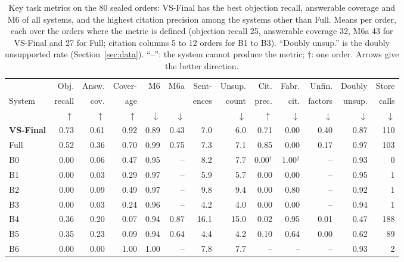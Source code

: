 \documentclass[11pt]{article}
\newcommand{\vs}{VS-Final}
\begin{document}
\begin{table}[t]
\centering\small
\setlength\tabcolsep{4.5pt}
\begin{tabular}{@{}lrrrrrrrrrrrr@{}}
\toprule
 & Obj. & Answ. & Cover- & M6 & M6a & Sent- & Unsup. & Cit. & Fabr. & Unfin. & Doubly & Store \\
System & recall & cov. & age & & & ences & count & prec. & cit. & factors & unsup. & calls \\
 & $\uparrow$ & $\uparrow$ & $\uparrow$ & $\downarrow$ & $\downarrow$ & & $\downarrow$ & $\uparrow$ & $\downarrow$ & $\downarrow$ & $\downarrow$ & $\downarrow$ \\
\midrule
\textbf{\vs{}} & 0.73 & 0.61 & 0.92 & 0.89 & 0.43 & 7.0 & 6.0 & 0.71 & 0.00 & 0.40 & 0.87 & 110 \\
Full & 0.52 & 0.36 & 0.70 & 0.99 & 0.75 & 7.3 & 7.1 & 0.85 & 0.00 & 0.17 & 0.97 & 103 \\
\midrule
B0 & 0.00 & 0.06 & 0.47 & 0.95 & -- & 8.2 & 7.7 & 0.00$^\dagger$ & 1.00$^\dagger$ & -- & 0.93 & 0 \\
B1 & 0.00 & 0.03 & 0.29 & 0.97 & -- & 5.9 & 5.7 & 0.00 & 0.00 & -- & 0.95 & 1 \\
B2 & 0.00 & 0.09 & 0.49 & 0.97 & -- & 9.8 & 9.4 & 0.00 & 0.80 & -- & 0.92 & 1 \\
B3 & 0.00 & 0.03 & 0.24 & 0.96 & -- & 4.2 & 4.0 & 0.00 & 0.00 & -- & 0.94 & 1 \\
B4 & 0.36 & 0.20 & 0.07 & 0.94 & 0.87 & 16.1 & 15.0 & 0.02 & 0.95 & 0.01 & 0.47 & 188 \\
B5 & 0.35 & 0.23 & 0.09 & 0.94 & 0.64 & 4.4 & 4.2 & 0.10 & 0.64 & 0.00 & 0.62 & 89 \\
B6 & 0.00 & 0.00 & 1.00 & 1.00 & -- & 7.8 & 7.7 & -- & -- & -- & 0.93 & 2 \\
\bottomrule
\end{tabular}
\caption{Key task metrics on the 80 sealed orders: \vs{} has the best objection recall, answerable coverage and M6 of all systems, and the highest citation precision among the systems other than Full. Means per order, each over the orders where the metric is defined (objection recall 25, answerable coverage 32, M6a 43 for \vs{} and 27 for Full; citation columns 5 to 12 orders for B1 to B3). ``Doubly unsup.'' is the doubly unsupported rate (Section~\ref{sec:data}). ``--'': the system cannot produce the metric; $\dagger$: one order. Arrows give the better direction.}
\label{tab:means}
\end{table}
\end{document}
